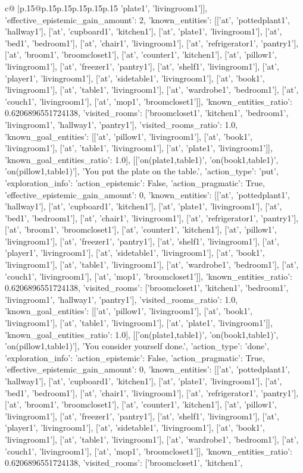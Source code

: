 \documentclass{article}
\begin{document}
{\begin{supertabular}{c@{$\;$}|p{.15\linewidth}@{}p{.15\linewidth}p{.15\linewidth}p{.15\linewidth}p{.15\linewidth}p{.15\linewidth}}
{{{'plate1', 'livingroom1']], 'effective_epistemic_gain_amount': 2, 'known_entities': [['at', 'pottedplant1', 'hallway1'], ['at', 'cupboard1', 'kitchen1'], ['at', 'plate1', 'livingroom1'], ['at', 'bed1', 'bedroom1'], ['at', 'chair1', 'livingroom1'], ['at', 'refrigerator1', 'pantry1'], ['at', 'broom1', 'broomcloset1'], ['at', 'counter1', 'kitchen1'], ['at', 'pillow1', 'livingroom1'], ['at', 'freezer1', 'pantry1'], ['at', 'shelf1', 'livingroom1'], ['at', 'player1', 'livingroom1'], ['at', 'sidetable1', 'livingroom1'], ['at', 'book1', 'livingroom1'], ['at', 'table1', 'livingroom1'], ['at', 'wardrobe1', 'bedroom1'], ['at', 'couch1', 'livingroom1'], ['at', 'mop1', 'broomcloset1']], 'known_entities_ratio': 0.6206896551724138, 'visited_rooms': ['broomcloset1', 'kitchen1', 'bedroom1', 'livingroom1', 'hallway1', 'pantry1'], 'visited_rooms_ratio': 1.0, 'known_goal_entities': [['at', 'pillow1', 'livingroom1'], ['at', 'book1', 'livingroom1'], ['at', 'table1', 'livingroom1'], ['at', 'plate1', 'livingroom1']], 'known_goal_entities_ratio': 1.0}}], [['on(plate1,table1)', 'on(book1,table1)', 'on(pillow1,table1)'], 'You put the plate on the table.', {'action_type': 'put', 'exploration_info': {'action_epistemic': False, 'action_pragmatic': True, 'effective_epistemic_gain_amount': 0, 'known_entities': [['at', 'pottedplant1', 'hallway1'], ['at', 'cupboard1', 'kitchen1'], ['at', 'plate1', 'livingroom1'], ['at', 'bed1', 'bedroom1'], ['at', 'chair1', 'livingroom1'], ['at', 'refrigerator1', 'pantry1'], ['at', 'broom1', 'broomcloset1'], ['at', 'counter1', 'kitchen1'], ['at', 'pillow1', 'livingroom1'], ['at', 'freezer1', 'pantry1'], ['at', 'shelf1', 'livingroom1'], ['at', 'player1', 'livingroom1'], ['at', 'sidetable1', 'livingroom1'], ['at', 'book1', 'livingroom1'], ['at', 'table1', 'livingroom1'], ['at', 'wardrobe1', 'bedroom1'], ['at', 'couch1', 'livingroom1'], ['at', 'mop1', 'broomcloset1']], 'known_entities_ratio': 0.6206896551724138, 'visited_rooms': ['broomcloset1', 'kitchen1', 'bedroom1', 'livingroom1', 'hallway1', 'pantry1'], 'visited_rooms_ratio': 1.0, 'known_goal_entities': [['at', 'pillow1', 'livingroom1'], ['at', 'book1', 'livingroom1'], ['at', 'table1', 'livingroom1'], ['at', 'plate1', 'livingroom1']], 'known_goal_entities_ratio': 1.0}}], [['on(plate1,table1)', 'on(book1,table1)', 'on(pillow1,table1)'], 'You consider yourself done.', {'action_type': 'done', 'exploration_info': {'action_epistemic': False, 'action_pragmatic': True, 'effective_epistemic_gain_amount': 0, 'known_entities': [['at', 'pottedplant1', 'hallway1'], ['at', 'cupboard1', 'kitchen1'], ['at', 'plate1', 'livingroom1'], ['at', 'bed1', 'bedroom1'], ['at', 'chair1', 'livingroom1'], ['at', 'refrigerator1', 'pantry1'], ['at', 'broom1', 'broomcloset1'], ['at', 'counter1', 'kitchen1'], ['at', 'pillow1', 'livingroom1'], ['at', 'freezer1', 'pantry1'], ['at', 'shelf1', 'livingroom1'], ['at', 'player1', 'livingroom1'], ['at', 'sidetable1', 'livingroom1'], ['at', 'book1', 'livingroom1'], ['at', 'table1', 'livingroom1'], ['at', 'wardrobe1', 'bedroom1'], ['at', 'couch1', 'livingroom1'], ['at', 'mop1', 'broomcloset1']], 'known_entities_ratio': 0.6206896551724138, 'visited_rooms': ['broomcloset1', 'kitchen1', }}}
\end{supertabular}}
\end{document}
